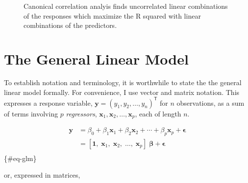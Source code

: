 \documentclass[
  letterpaper,
  10pt,
  krantz2]{krantz}
\begin{document}
\begin{figure}


\caption{\label{fig-lin-comb4}Canonical correlation analyis finds
uncorrelated linear combinations of the responses which maximize the R
squared with linear combinations of the predictors.}

\end{figure}%

\section{The General Linear Model}\label{sec-GLM}

To establish notation and terminology, it is worthwhile to state the the
general linear model formally. For convenience, I use vector and matrix
notation. This expresses a response variable,
\(\mathbf{y} = (y_1, y_2, \dots , y_n)^\mathsf{T}\) for \(n\)
observations, as a sum of terms involving \(p\) \emph{regressors},
\(\mathbf{x}_1, \mathbf{x}_2, \dots , \mathbf{x}_p\), each of length
\(n\).

\begin{align*}
\mathbf{y} & = \beta_0 + \beta_1 \mathbf{x}_1 + \beta_2 \mathbf{x}_2 + \cdots + \beta_p \mathbf{x}_p + \mathbf{\epsilon} \\
           & = \left[ \mathbf{1},\; \mathbf{x}_1,\; \mathbf{x}_2,\; \dots ,\; \mathbf{x}_p \right] \; \boldsymbol{\beta} + \boldsymbol{\epsilon} \\
\end{align*} \{\#eq-glm\}

or, expressed in matrices,
\end{document}
